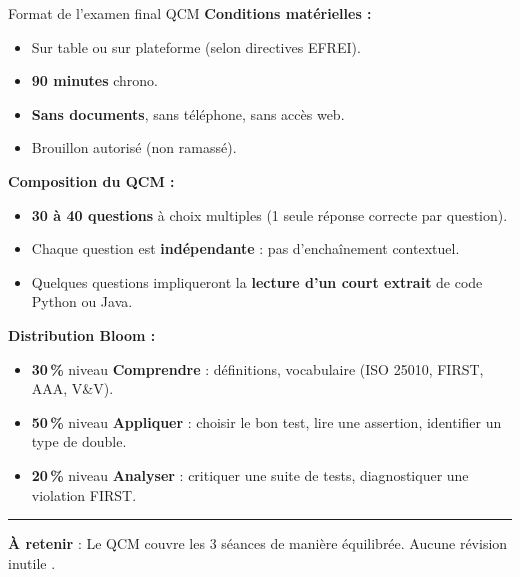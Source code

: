 \documentclass[aspectratio=169,11pt]{beamer}
\newcommand{\takeaway}[1]{%
\vfill\begin{beamercolorbox}[wd=\linewidth,sep=0.4em]{}
\color{accent2}\rule[0.6ex]{1.2em}{1.2pt}\hspace{0.4em}%
\textbf{\color{accent2}\small À retenir} \textcolor{textsoft}{:} %
{\small\color{textmain}#1}
\end{beamercolorbox}}
\begin{document}
\begin{frame}[t,shrink=10]{Format de l'examen final QCM}
\footnotesize
\textbf{Conditions matérielles :}
\begin{itemize}\itemsep0.08em
\item Sur table ou sur plateforme (selon directives EFREI).
\item \textbf{90 minutes} chrono.
\item \textbf{Sans documents}, sans téléphone, sans accès web.
\item Brouillon autorisé (non ramassé).
\end{itemize}
\vspace{0.5cm}
\textbf{Composition du QCM :}
\begin{itemize}\itemsep0.08em
\item \textbf{30 à 40 questions} à choix multiples (1 seule réponse correcte par question).
\item Chaque question est \textbf{indépendante} : pas d'enchaînement contextuel.
\item Quelques questions impliqueront la \textbf{lecture d'un court extrait} de code Python ou Java.
\end{itemize}
\vspace{0.5cm}
\textbf{Distribution Bloom :}
\begin{itemize}\itemsep0.05em
\item \textbf{30\,\%} niveau \textbf{Comprendre} : définitions, vocabulaire (ISO 25010, FIRST, AAA, V\&V).
\item \textbf{50\,\%} niveau \textbf{Appliquer} : choisir le bon test, lire une assertion, identifier un type de double.
\item \textbf{20\,\%} niveau \textbf{Analyser} : critiquer une suite de tests, diagnostiquer une violation FIRST.
\end{itemize}
\takeaway{Le QCM couvre les 3 séances de manière équilibrée. Aucune révision \og inutile \fg{}.}
\end{frame}
\end{document}
